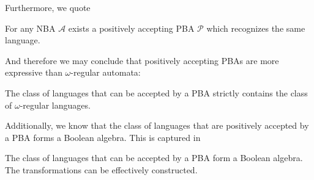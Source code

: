 Furthermore, we quote
\begin{lemma}
  \cite[Lemma 5]{RecOmeLangProbAuto} For any \ac{NBA} $\mathcal{A}$ exists a
  positively accepting \ac{PBA} $\mathcal{P}$ which recognizes the same
  language.
\end{lemma}
And therefore we may conclude that positively accepting \acp{PBA} are more
expressive than $\omega$-regular automata:
\begin{theorem}
  \cite[Theorem 4]{RecOmeLangProbAuto}
  The class of languages that can be accepted by a \ac{PBA} strictly contains
  the class of $\omega$-regular languages.
\end{theorem}
Additionally, we know that the class of languages that are positively accepted 
by a \ac{PBA} forms a Boolean algebra. This is captured in
\begin{theorem}
  \cite[Chapter 4.3.]{Groesser}
  The class of languages that can be accepted by a \ac{PBA} form a Boolean 
  algebra. The transformations can be effectively constructed.
  \label{thm:pbaboolalgebra}
\end{theorem}
